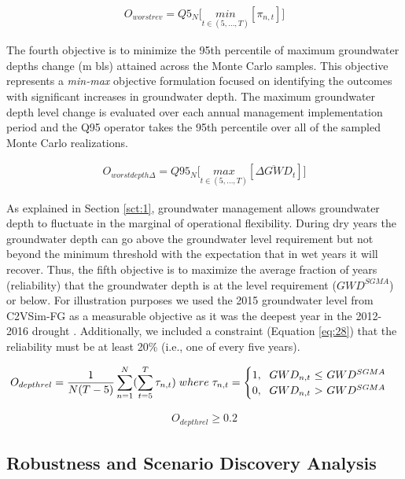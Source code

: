 \documentclass[a4paper,fleqn]{cas-sc}
\begin{document}
\begin{align}
O_{worstrev} = Q5_{N} \bigg[\underset{t\in(5,...,T)}{min}[\pi_{n,t}]\bigg]
\end{align}

The fourth objective is to minimize the 95th percentile of maximum groundwater depths change (m bls) attained across the Monte Carlo samples. This objective represents a \textit{min-max} objective formulation focused on identifying the outcomes with significant increases in groundwater depth. The maximum groundwater depth level change is evaluated over each annual management implementation period and the Q95 operator takes the 95th percentile over all of the sampled Monte Carlo  realizations. 

\begin{align}
O_{worstdepth\Delta} = Q95_{N} \bigg[\underset{t\in(5,...,T)}{max}[\overline{\Delta GWD}_{t}]\bigg]
\end{align}

As explained in Section \ref{sct:1}, groundwater management allows groundwater depth to fluctuate in the marginal of operational flexibility. During dry years the groundwater depth can go above the groundwater level requirement but not beyond the minimum threshold with the expectation that in wet years it will recover. Thus, the fifth objective is to maximize the average fraction of years (reliability) that the groundwater depth is at the level requirement ($GWD^{SGMA}$) or below. For illustration purposes we used the 2015 groundwater level from C2VSim-FG as a measurable objective as it was the deepest year in the  2012-2016 drought \citep{lund_lessons_2018}. Additionally, we included a constraint (Equation \ref{eq:28}) that the reliability must be at least 20\% (i.e., one of every five years). 

\begin{align}
O_{depthrel} = \frac{1}{N(T-5)}\sum_{n=1}^N(\sum_{t=5}^T \tau_{n,t})\; where\; \tau_{n,t} = \begin{cases}
      1, \text{\; $GWD_{n,t}$  $\leq$ $GWD^{SGMA}$}\\
      0, \text{\; $GWD_{n,t}$ $>$ $GWD^{SGMA}$}\\
\end{cases}      
\end{align}


\begin{align}\label{eq:28}
O_{depthrel} \geq 0.2
\end{align}

\subsection{Robustness and Scenario Discovery Analysis}\label{sct:3.3}
\end{document}
